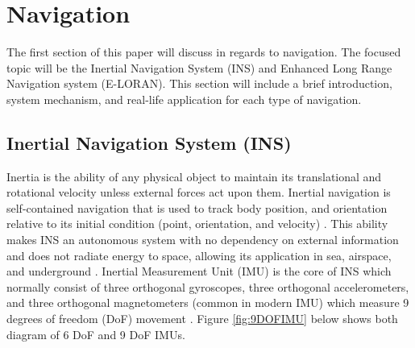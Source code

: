 \newpage
\setcounter{page}{1}
\justifying
\noindent

\section{Navigation}
The first section of this paper will discuss in regards to navigation. The focused topic will be the Inertial Navigation System (INS) and Enhanced Long Range Navigation system (E-LORAN). This section will include a brief introduction, system mechanism, and real-life application for each type of navigation.\\

\subsection{Inertial Navigation System (INS)}
Inertia is the ability of any physical object to maintain its translational and rotational velocity unless external forces act upon them. Inertial navigation is self-contained navigation that is used to track body position, and orientation relative to its initial condition (point, orientation, and velocity) \cite{Woodman2007NumberNavigation}\cite{Ribbens2003AircraftInstruments}. This ability makes INS an autonomous system with no dependency on external information and does not radiate energy to space, allowing its application in sea, airspace, and underground \cite{2018MiniatureUnit}. Inertial Measurement Unit (IMU) is the core of INS which normally consist of three orthogonal gyroscopes, three orthogonal accelerometers, and three orthogonal magnetometers (common in modern IMU) which measure 9 degrees of freedom (DoF) movement \cite{Christ2014NavigationalSensors}. Figure \ref{fig:9DOFIMU} below shows both diagram of 6 DoF and 9 DoF IMUs.\\

